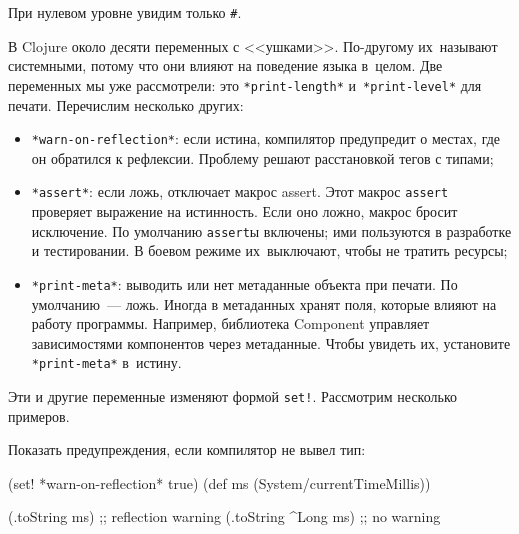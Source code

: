 \fi

\noindent
При нулевом уровне увидим только \verb|#|.

В Clojure около десяти переменных с <<ушками>>. По-другому их~называют
системными, потому что они влияют на поведение языка в~целом. Две переменных мы
уже рассмотрели: это \verb|*print-length*| и~\verb|*print-level*| для
печати. Перечислим несколько других:


\begin{itemize}


\item
  \verb|*warn-on-reflection*|: если истина, компилятор предупредит о местах, где
  он обратился к рефлексии. Проблему решают расстановкой тегов с типами;


\item
  \verb|*assert*|: если ложь, отключает макрос assert. Этот макрос \verb|assert|
  проверяет выражение на истинность. Если оно ложно, макрос бросит исключение.
  По умолчанию \verb|assert|ы включены; ими пользуются в разработке и
  тестировании. В боевом режиме их~выключают, чтобы не тратить ресурсы;

\label{print-meta}


\item
  \verb|*print-meta*|: выводить или нет метаданные объекта при печати. По
  умолчанию~--- ложь. Иногда в метаданных хранят поля, которые влияют на работу
  программы. Например, библиотека Component управляет зависимостями компонентов
  через метаданные. Чтобы увидеть их, установите \verb|*print-meta*| в~истину.

\end{itemize}

Эти и другие переменные изменяют формой \verb|set!|. Рассмотрим несколько
примеров.

Показать предупреждения, если компилятор не вывел тип:

\ifnarrow

\begin{english}
  \begin{clojure}
(set! *warn-on-reflection* true)
(def ms (System/currentTimeMillis))

(.toString ms) ;; reflection warning
(.toString ^Long ms) ;; no warning
  \end{clojure}
\end{english}

